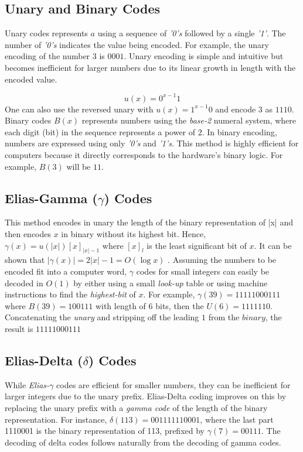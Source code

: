 \subsection{Unary and Binary Codes}
Unary codes represents $a$ using a sequence of \textit{'0's} followed by a single \textit{'1'}. The number of \textit{'0's} indicates the value being encoded. For example, the unary encoding of the number $3$ is $0001$. Unary encoding is simple and intuitive but becomes inefficient for larger numbers due to its linear growth in length with the encoded value.\par
$$u(x) = 0^{x-1}1$$
One can also use the reversed unary with $u(x) = 1^{x-1}0$ and encode $3$ as $1110$. Binary codes $B(x)$ represents numbers using the \textit{base-2} numeral system, where each digit (bit) in the sequence represents a power of $2$. In binary encoding, numbers are expressed using only \textit{'0's} and \textit{'1's}. This method is highly efficient for computers because it directly corresponds to the hardware's binary logic. For example, $B(3)$ will be $11$.
\subsection{Elias-Gamma ($\gamma$) Codes}
This method encodes in unary the length of the binary representation of |x| and then encodes $x$ in binary without its highest bit. Hence, $\gamma(x) = u(|x|) [x]_{|x|-1}$ where $[x]_l$ is the least significant bit of $x$. It can be shown that $|\gamma(x)| = 2|x| - 1 = O(\log x)$ \cite{Elias_1975}. Assuming the numbers to be encoded fit into a computer word, $\gamma$ codes for small integers can easily be decoded in $O(1)$ by either using a small \textit{look-up} table or using machine instructions to find the \textit{highest-bit} of $x$. For example, $\gamma(39) =  11111000111$ where $B(39) = 100111$ with length of $6$ bits, then the $U(6) = 1111110$. Concatenating the \textit{unary} and stripping off the leading $1$ from the $binary$, the result is $11111000111$
\subsection{Elias-Delta ($\delta$) Codes}
While \textit{Elias-$\gamma$} codes are efficient for smaller numbers, they can be inefficient for larger integers due to the unary prefix. Elias-Delta coding improves on this by replacing the unary prefix with a \textit{gamma code} of the length of the binary representation. For instance, \(\delta(113) = 001111110001\), where the last part 1110001 is the binary representation of 113, prefixed by \(\gamma(7) = 00111\). The decoding of delta codes follows naturally from the decoding of gamma codes.

